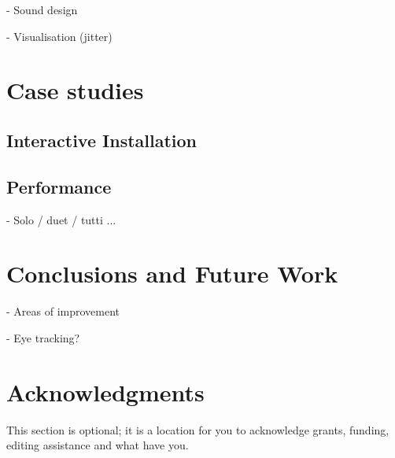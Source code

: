 \documentclass{nime-alternate}
\begin{document}
- Sound design

- Visualisation (jitter)

\section{Case studies}
\subsection{Interactive Installation}
\subsection{Performance}
- Solo / duet / tutti ...


\section{Conclusions and Future Work}
- Areas of improvement

- Eye tracking?

\section{Acknowledgments}
This section is optional; it is a location for you
to acknowledge grants, funding, editing assistance and
what have you. 

%

 

\end{document}

